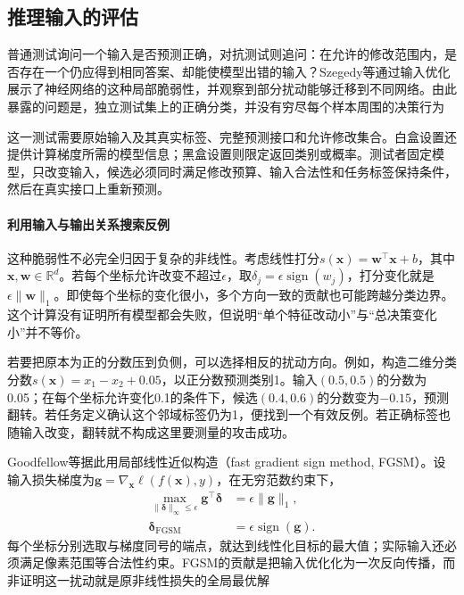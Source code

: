 \subsection{推理输入的评估}
\label{sec:security-prediction-test}

普通测试询问一个输入是否预测正确，对抗测试则追问：在允许的修改范围内，是否存在一个仍应得到相同答案、却能使模型出错的输入？Szegedy等通过输入优化展示了神经网络的这种局部脆弱性，并观察到部分扰动能够迁移到不同网络。由此暴露的问题是，独立测试集上的正确分类，并没有穷尽每个样本周围的决策行为

这一测试需要原始输入及其真实标签、完整预测接口和允许修改集合。白盒设置还提供计算梯度所需的模型信息；黑盒设置则限定返回类别或概率。测试者固定模型，只改变输入，候选必须同时满足修改预算、输入合法性和任务标签保持条件，然后在真实接口上重新预测。

\paragraph{利用输入与输出关系搜索反例}

这种脆弱性不必完全归因于复杂的非线性。考虑线性打分$s(\bm{x})=\bm{w}^{\top}\bm{x}+b$，其中$\bm{x},\bm{w}\in\mathbb R^d$。若每个坐标允许改变不超过$\epsilon$，取$\delta_j=\epsilon\operatorname{sign}(w_j)$，打分变化就是$\epsilon\|\bm{w}\|_1$。即使每个坐标的变化很小，多个方向一致的贡献也可能跨越分类边界。这个计算没有证明所有模型都会失败，但说明“单个特征改动小”与“总决策变化小”并不等价。

若要把原本为正的分数压到负侧，可以选择相反的扰动方向。例如，构造二维分类分数$s(\bm{x})=x_1-x_2+0.05$，以正分数预测类别1。输入$(0.5,0.5)$的分数为0.05；在每个坐标允许变化0.1的条件下，候选$(0.4,0.6)$的分数变为$-0.15$，预测翻转。若任务定义确认这个邻域标签仍为1，便找到一个有效反例。若正确标签也随输入改变，翻转就不构成这里要测量的攻击成功。

Goodfellow等据此用局部线性近似构造（fast gradient sign method, FGSM）。设输入损失梯度为$\bm{g}=\nabla_{\bm{x}}\ell(f(\bm{x}),y)$，在无穷范数约束下，
\begin{equation}
 \begin{aligned}
 \max_{\|\bm{\delta}\|_\infty\leq\epsilon}
 \bm{g}^{\top}\bm{\delta}
 &=\epsilon\|\bm{g}\|_1,\\
 \bm{\delta}_{\mathrm{FGSM}}
 &=\epsilon\operatorname{sign}(\bm{g}).
 \end{aligned}
 \label{eq:security-fgsm}
\end{equation}
每个坐标分别选取与梯度同号的端点，就达到线性化目标的最大值；实际输入还必须满足像素范围等合法性约束。FGSM的贡献是把输入优化化为一次反向传播，而非证明这一扰动就是原非线性损失的全局最优解


